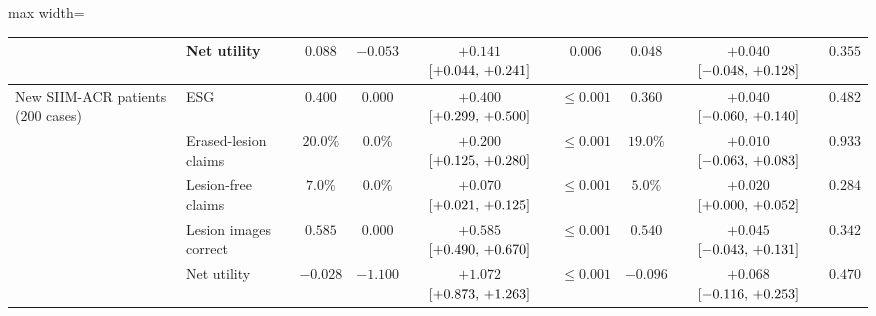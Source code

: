 \begin{table}[!htbp]
\begin{adjustbox}{max width=\linewidth}
\begin{tabular}{ll c c cc c cc}
 & Net utility & $0.088$ & $-0.053$ & $+0.141$ $[+0.044,\,+0.241]$ & $0.006$ & $0.048$ & $+0.040$ $[-0.048,\,+0.128]$ & $0.355$ \\
\midrule
New SIIM-ACR patients ($200$ cases) & ESG & $0.400$ & $0.000$ & $+0.400$ $[+0.299,\,+0.500]$ & $\le 0.001$ & $0.360$ & $+0.040$ $[-0.060,\,+0.140]$ & $0.482$ \\
 & Erased-lesion claims & $20.0\%$ & $0.0\%$ & $+0.200$ $[+0.125,\,+0.280]$ & $\le 0.001$ & $19.0\%$ & $+0.010$ $[-0.063,\,+0.083]$ & $0.933$ \\
 & Lesion-free claims & $7.0\%$ & $0.0\%$ & $+0.070$ $[+0.021,\,+0.125]$ & $\le 0.001$ & $5.0\%$ & $+0.020$ $[+0.000,\,+0.052]$ & $0.284$ \\
 & Lesion images correct & $0.585$ & $0.000$ & $+0.585$ $[+0.490,\,+0.670]$ & $\le 0.001$ & $0.540$ & $+0.045$ $[-0.043,\,+0.131]$ & $0.342$ \\
 & Net utility & $-0.028$ & $-1.100$ & $+1.072$ $[+0.873,\,+1.263]$ & $\le 0.001$ & $-0.096$ & $+0.068$ $[-0.116,\,+0.253]$ & $0.470$ \\
\bottomrule
\end{tabular}
\end{adjustbox}


\end{table}
